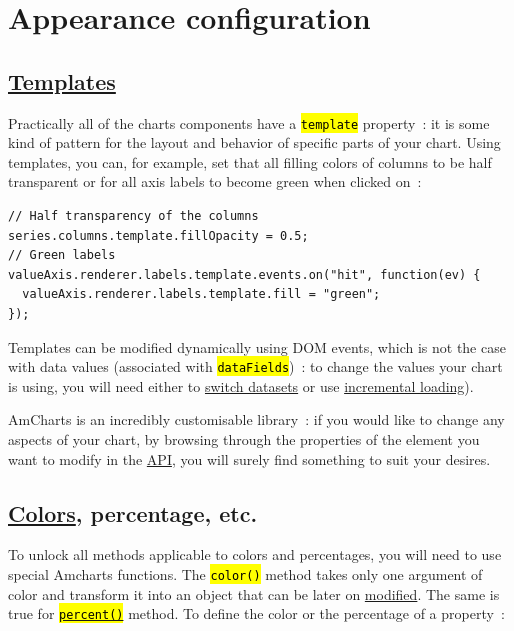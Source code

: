 \documentclass[a4paper,12pt,twoside]{book}
\let\OldTexttt\texttt
\renewcommand{\texttt}[1]{\OldTexttt{\hl{#1}}}
\begin{document}
		\section{Appearance configuration}\label{appearance-configuration}

			\subsection{\href{https://www.amcharts.com/docs/v4/concepts/list-templates/}{Templates}}\label{templates}

Practically all of the charts components have a \texttt{template} property~: it is some kind of pattern for the layout and behavior of specific parts of your chart. Using templates, you can, for example, set that all filling colors of columns to be half transparent or for all axis labels to become green when clicked on~:

\begin{lstlisting}
// Half transparency of the columns
series.columns.template.fillOpacity = 0.5;
// Green labels
valueAxis.renderer.labels.template.events.on("hit", function(ev) {
  valueAxis.renderer.labels.template.fill = "green";
});
\end{lstlisting}

Templates can be modified dynamically using DOM events, which is not the case with data values (associated with \texttt{dataFields})~: to change the values your chart is using, you will need either to \href{https://codepen.io/segolene-albouy/pen/rExamo}{switch datasets} or use \href{https://www.amcharts.com/docs/v4/concepts/data/\#Incremental_updates}{incremental loading}).

AmCharts is an incredibly customisable library~: if you would like to change any aspects of your chart, by browsing through the properties of the element you want to modify in the \href{https://www.amcharts.com/docs/v4/reference/}{API}, you will surely find something to suit your desires.

			\subsection{\href{https://www.amcharts.com/docs/v4/concepts/colors/}{Colors}, percentage, etc.}\label{colors-percentage-etc.}

To unlock all methods applicable to colors and percentages, you will need to use special Amcharts functions. The \texttt{color()} method takes only one argument of color and transform it into an object that can be later on \href{https://www.amcharts.com/docs/v4/reference/color/\#Methods}{modified}. The same is true for \href{https://www.amcharts.com/docs/v4/reference/percent/}{\texttt{percent()}} method. To define the color or the percentage of a property~:
\end{document}
